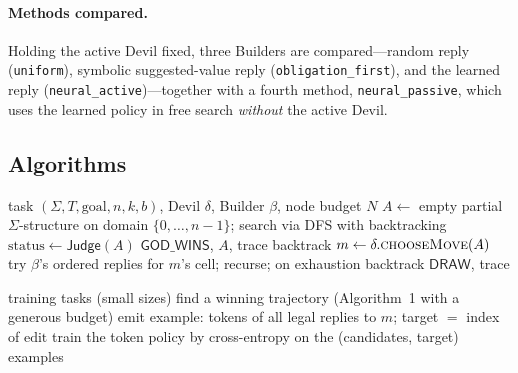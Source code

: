 \documentclass[11pt]{article}
\newcommand{\Judge}{\ensuremath{\mathsf{Judge}}}
\begin{document}
\paragraph{Methods compared.}
Holding the active Devil fixed, three Builders are compared---random reply (\texttt{uniform}), symbolic suggested-value reply (\texttt{obligation\_first}), and the learned reply (\texttt{neural\_active})---together with a fourth method, \texttt{neural\_passive}, which uses the learned policy in free search \emph{without} the active Devil.

\subsection{Algorithms}

\begin{algorithm}[h]
\caption{Active Neural Fra\"iss\'e fight}
\begin{algorithmic}[1]
\Require task \((\Sigma,T,\text{goal},n,k,b)\), Devil \(\delta\), Builder \(\beta\), node budget \(N\)
\State \(A\gets\) empty partial \(\Sigma\)-structure on domain \(\{0,\dots,n-1\}\); search via DFS with backtracking
  \State \(\text{status}\gets \Judge(A)\) 
   \Return \(\mathsf{GOD\_WINS}\), \(A\), trace \EndIf
   backtrack \EndIf
  \State \(m\gets\delta.\textsc{chooseMove}(A)\) 
  \State try \(\beta\)'s ordered replies for \(m\)'s cell; recurse; on exhaustion backtrack
\EndWhile
\State \Return \(\mathsf{DRAW}\), trace
\end{algorithmic}
\end{algorithm}

\begin{algorithm}[h]
\caption{Training the Builder from active-game traces}
\begin{algorithmic}[1]
\Require training tasks (small sizes)
  \State find a winning trajectory (Algorithm~1 with a generous budget)
    \State emit example: tokens of all legal replies to \(m\); target \(=\) index of \(\text{edit}\)
  \EndFor
\EndFor
\State train the token policy by cross-entropy on the (candidates, target) examples
\end{algorithmic}
\end{algorithm}
\end{document}
